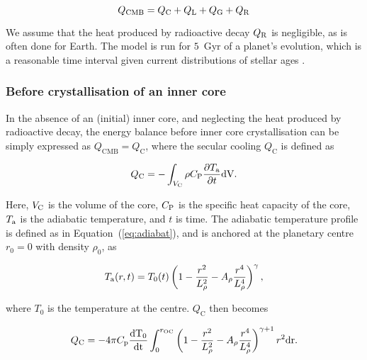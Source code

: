 \documentclass[draft]{agujournal2019} %
\begin{document}
\begin{linenomath*}
\begin{equation}
\label{eq:en_bal}
Q_{\rm CMB}=Q_{\rm C}+Q_{\rm L}+Q_{\rm G} + Q_{\rm R}
\end{equation}
\end{linenomath*}

We assume that the heat produced by radioactive decay $Q_{\rm R}$ is negligible, as is often done for Earth. The model is run for $5$~Gyr of a planet's evolution, which is a reasonable time interval given current distributions of stellar ages \cite{frank2014radiogenic,safonova2016age}. 

\subsubsection{Before crystallisation of an inner core} \label{sec:no_ic}

In the absence of an (initial) inner core, and neglecting the heat produced by radioactive decay, the energy balance before inner core crystallisation can be simply expressed as $Q_{\mathrm{CMB}} = Q_{\mathrm{C}}$, where the secular cooling $Q_{\mathrm{C}}$ is defined as

\begin{linenomath*}
\begin{equation}
Q_{\rm C} = -\int _{V_{\rm C}} \rho C_{\rm P} \frac{\partial T_{\rm a}}{\partial t} \rm{d}V.
\end{equation}
\end{linenomath*}

Here, $V_{\rm C}$ is the volume of the core, $C_{\rm P}$ is the specific heat capacity of the core, $T_{\rm a}$ is the adiabatic temperature, and $t$ is time. The adiabatic temperature profile is defined as in Equation~(\ref{eq:adiabat}), and is anchored at the planetary centre $r_{\mathrm{0}}=0$ with density $\rho_{\mathrm{0}}$, as

\begin{linenomath*}
\begin{equation}
T_{\rm a}(r, t)=T_{\mathrm{0}}(t) \left ( 1-\frac{r^2}{L_{\mathrm{\rho}} ^2}-A_{\mathrm{\rho}} \frac{r^4}{L_{\mathrm{\rho}}^4}\right )^{\gamma},
\end{equation}
\end{linenomath*}
where $T_{\mathrm{0}}$ is the temperature at the centre. $Q_{\mathrm{C}}$ then becomes

\begin{linenomath*}
\begin{equation}
Q_{\mathrm{C}} = - 4 \pi C_{\mathrm{p}}\frac{\rm{d}T_{\mathrm{0}}}{\rm{d}t}\int_0^{r_{\mathrm{OC}}}  \left( 1-\frac{r^2}{L_{\mathrm{\rho}}^2}-A_{\mathrm{\rho}} \frac{r^4}{L_{\mathrm{\rho}}^4}\right)^{\gamma+1} r^2\rm{d}r.
\end{equation}
\end{linenomath*}
\end{document}
